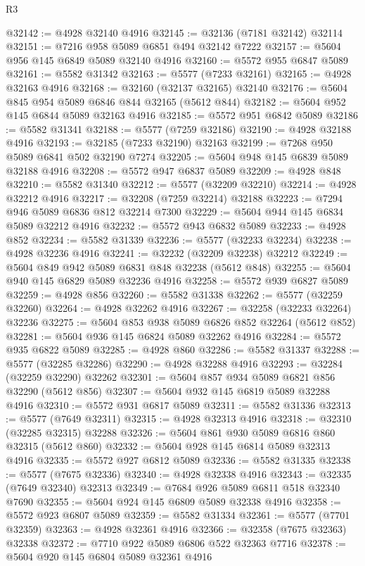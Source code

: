 \begin{lexlean}{R3}
\begin{coremodule}
@32142 := @4928 @32140 @4916
@32145 := @32136 (@7181 @32142) @32114
@32151 := @7216 @958 @5089 @6851 @494 @32142 @7222
@32157 := @5604 @956 @145 @6849 @5089 @32140 @4916
@32160 := @5572 @955 @6847 @5089
@32161 := @5582 @31342
@32163 := @5577 (@7233 @32161)
@32165 := @4928 @32163 @4916
@32168 := @32160 (@32137 @32165) @32140
@32176 := @5604 @845 @954 @5089 @6846 @844 @32165 (@5612 @844)
@32182 := @5604 @952 @145 @6844 @5089 @32163 @4916
@32185 := @5572 @951 @6842 @5089
@32186 := @5582 @31341
@32188 := @5577 (@7259 @32186)
@32190 := @4928 @32188 @4916
@32193 := @32185 (@7233 @32190) @32163
@32199 := @7268 @950 @5089 @6841 @502 @32190 @7274
@32205 := @5604 @948 @145 @6839 @5089 @32188 @4916
@32208 := @5572 @947 @6837 @5089
@32209 := @4928 @848
@32210 := @5582 @31340
@32212 := @5577 (@32209 @32210)
@32214 := @4928 @32212 @4916
@32217 := @32208 (@7259 @32214) @32188
@32223 := @7294 @946 @5089 @6836 @812 @32214 @7300
@32229 := @5604 @944 @145 @6834 @5089 @32212 @4916
@32232 := @5572 @943 @6832 @5089
@32233 := @4928 @852
@32234 := @5582 @31339
@32236 := @5577 (@32233 @32234)
@32238 := @4928 @32236 @4916
@32241 := @32232 (@32209 @32238) @32212
@32249 := @5604 @849 @942 @5089 @6831 @848 @32238 (@5612 @848)
@32255 := @5604 @940 @145 @6829 @5089 @32236 @4916
@32258 := @5572 @939 @6827 @5089
@32259 := @4928 @856
@32260 := @5582 @31338
@32262 := @5577 (@32259 @32260)
@32264 := @4928 @32262 @4916
@32267 := @32258 (@32233 @32264) @32236
@32275 := @5604 @853 @938 @5089 @6826 @852 @32264 (@5612 @852)
@32281 := @5604 @936 @145 @6824 @5089 @32262 @4916
@32284 := @5572 @935 @6822 @5089
@32285 := @4928 @860
@32286 := @5582 @31337
@32288 := @5577 (@32285 @32286)
@32290 := @4928 @32288 @4916
@32293 := @32284 (@32259 @32290) @32262
@32301 := @5604 @857 @934 @5089 @6821 @856 @32290 (@5612 @856)
@32307 := @5604 @932 @145 @6819 @5089 @32288 @4916
@32310 := @5572 @931 @6817 @5089
@32311 := @5582 @31336
@32313 := @5577 (@7649 @32311)
@32315 := @4928 @32313 @4916
@32318 := @32310 (@32285 @32315) @32288
@32326 := @5604 @861 @930 @5089 @6816 @860 @32315 (@5612 @860)
@32332 := @5604 @928 @145 @6814 @5089 @32313 @4916
@32335 := @5572 @927 @6812 @5089
@32336 := @5582 @31335
@32338 := @5577 (@7675 @32336)
@32340 := @4928 @32338 @4916
@32343 := @32335 (@7649 @32340) @32313
@32349 := @7684 @926 @5089 @6811 @518 @32340 @7690
@32355 := @5604 @924 @145 @6809 @5089 @32338 @4916
@32358 := @5572 @923 @6807 @5089
@32359 := @5582 @31334
@32361 := @5577 (@7701 @32359)
@32363 := @4928 @32361 @4916
@32366 := @32358 (@7675 @32363) @32338
@32372 := @7710 @922 @5089 @6806 @522 @32363 @7716
@32378 := @5604 @920 @145 @6804 @5089 @32361 @4916

\end{coremodule}
\end{lexlean}
